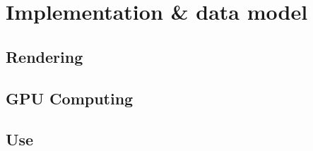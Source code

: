 \section{Implementation \& data model}
\label{sec:implementation}
\subsection{Rendering}
\label{subsec:rendering}
\subsection{GPU Computing}
\subsection{Use}
